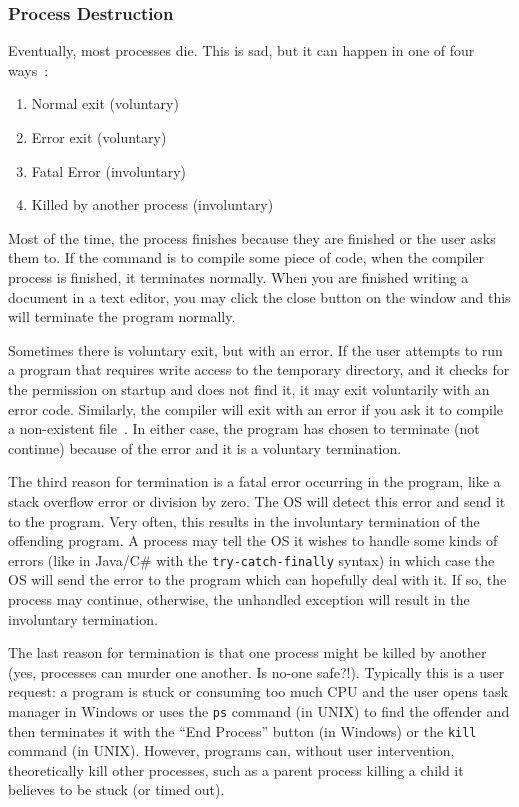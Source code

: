 \documentclass[a4paper]{report}
\begin{document}
\subsubsection*{Process Destruction}

Eventually, most processes die. This is sad, but it can happen in one of four ways~\cite{mos}:
\begin{enumerate}
	\item Normal exit (voluntary)
	\item Error exit (voluntary)
	\item Fatal Error (involuntary)
	\item Killed by another process (involuntary)
\end{enumerate}

Most of the time, the process finishes because they are finished or the user asks them to. If the command is to compile some piece of code, when the compiler process is finished, it terminates normally. When you are finished writing a document in a text editor, you may click the close button on the window and this will terminate the program normally.

Sometimes there is voluntary exit, but with an error. If the user attempts to run a program that requires write access to the temporary directory, and it checks for the permission on startup and does not find it, it may exit voluntarily with an error code. Similarly, the compiler will exit with an error if you ask it to compile a non-existent file~\cite{mos}. In either case, the program has chosen to terminate (not continue) because of the error and it is a voluntary termination.

The third reason for termination is a fatal error occurring in the program, like a stack overflow error or division by zero. The OS will detect this error and send it to the program. Very often, this results in the involuntary termination of the offending program. A process may tell the OS it wishes to handle some kinds of errors (like in Java/C\# with the \texttt{try-catch-finally} syntax) in which case the OS will send the error to the program which can hopefully deal with it. If so, the process may continue, otherwise, the unhandled exception will result in the involuntary termination.

The last reason for termination is that one process might be killed by another (yes, processes can murder one another. Is no-one safe?!). Typically this is a user request: a program is stuck or consuming too much CPU and the user opens task manager in Windows or uses the \texttt{ps} command (in UNIX) to find the offender and then terminates it with the ``End Process'' button (in Windows) or the \texttt{kill} command (in UNIX). However, programs can, without user intervention, theoretically kill other processes, such as a parent process killing a child it believes to be stuck (or timed out).
\end{document}
